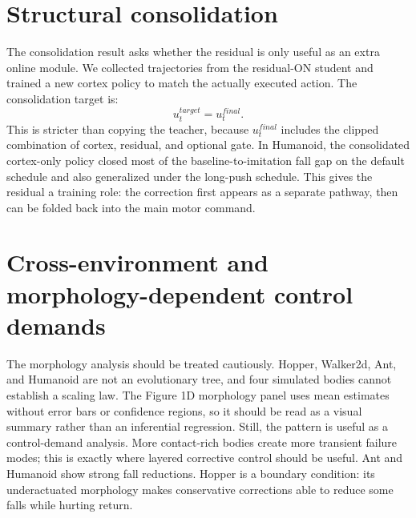 \documentclass[11pt]{article}
\begin{document}
\section{Structural consolidation}
The consolidation result asks whether the residual is only useful as an extra online module.  We collected trajectories from the residual-ON student and trained a new cortex policy to match the actually executed action.  The consolidation target is:
\[
u_t^{target} = u_t^{final}.
\]
This is stricter than copying the teacher, because $u_t^{final}$ includes the clipped combination of cortex, residual, and optional gate.  In Humanoid, the consolidated cortex-only policy closed most of the baseline-to-imitation fall gap on the default schedule and also generalized under the long-push schedule.  This gives the residual a training role: the correction first appears as a separate pathway, then can be folded back into the main motor command.

\section{Cross-environment and morphology-dependent control demands}
\begin{table}[h]
\centering
\small

\caption{Cross-environment summary.  Humanoid rows use the N=20 default-schedule result; other environments use the saved cross-environment replication summaries.}
\end{table}

The morphology analysis should be treated cautiously.  Hopper, Walker2d, Ant, and Humanoid are not an evolutionary tree, and four simulated bodies cannot establish a scaling law. The Figure 1D morphology panel uses mean estimates without error bars or confidence regions, so it should be read as a visual summary rather than an inferential regression.  Still, the pattern is useful as a control-demand analysis.  More contact-rich bodies create more transient failure modes; this is exactly where layered corrective control should be useful.  Ant and Humanoid show strong fall reductions.  Hopper is a boundary condition: its underactuated morphology makes conservative corrections able to reduce some falls while hurting return.

\begin{table}[h]
\centering
\small

\caption{Morphology table used for the exploratory scaling plot.  Values may differ from Table~\ref{tab:humanoid} because this plot uses the cross-environment matched summary rather than the full Humanoid N=20 default-schedule summary.  The regression confidence intervals are wide; this table is best read as motivation for future work rather than a final scaling law.}
\label{tab:morphology}
\end{table}
\end{document}

